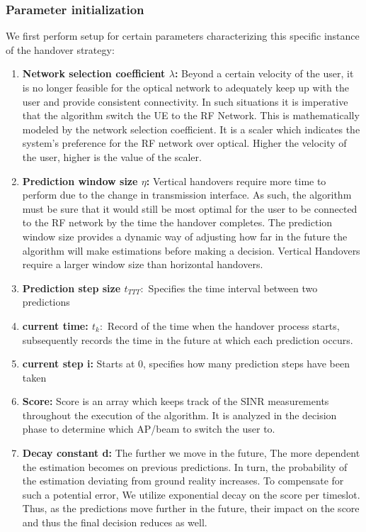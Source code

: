 \subsubsection{Parameter initialization}
We first perform setup for certain parameters characterizing this specific instance of the handover strategy:
\begin{enumerate}
    \item \textbf{Network selection coefficient $\lambda$:} Beyond a certain velocity of the user, it is no longer feasible for the optical network to adequately keep up with the user and provide consistent connectivity. In such situations it is imperative that the algorithm switch the UE to the RF Network. This is mathematically modeled by the network selection coefficient. It is a scaler which indicates the system's preference for the RF network over optical. Higher the velocity of the user, higher is the value of the scaler.
    \item \textbf{Prediction window size $\eta$:} Vertical handovers require more time to perform due to the change in transmission interface. As such, the algorithm must be sure that it would still be most optimal for the user to be connected to the RF network by the time the handover completes. The prediction window size provides a dynamic way of adjusting how far in the future the algorithm will make estimations before making a decision. Vertical Handovers require a larger window size than horizontal handovers. 
    \item \textbf{Prediction step size $t_{TTT}:$} Specifies the time interval between two predictions
    \item \textbf{current time: $t_k:$} Record of the time when the handover process starts, subsequently records the time in the future at which each prediction occurs.
    \item \textbf{current step i:} Starts at 0, specifies how many prediction steps have been taken
    \item \textbf{Score:} Score is an array which keeps track of the SINR measurements throughout the execution of the algorithm. It is analyzed in the decision phase to determine which AP/beam to switch the user to.
    \item \textbf{Decay constant d:} The further we move in the future, The more dependent the estimation becomes on previous predictions. In turn, the probability of the estimation deviating from ground reality increases. To compensate for such a potential error, We utilize exponential decay on the score per timeslot. Thus, as the predictions move further in the future, their impact on the score and thus the final decision reduces as well.
\end{enumerate}

